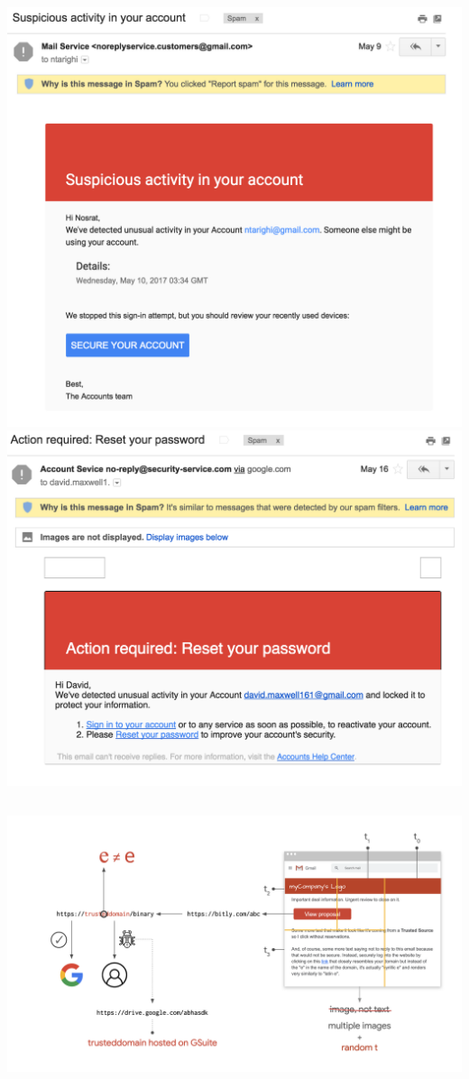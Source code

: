 \documentclass[nobackground,dvipsnames,table,aspectratio=169]{beamer}
\begin{document}
\begin{frame}{}
\begin{columns}
            \includegraphics[width=\textwidth]{susmail2}
            \includegraphics[width=\textwidth]{susmail4}
    \end{columns}
\end{frame}

\begin{frame}{}%
    \thispagestyle{empty}
    \includegraphics[width=\paperwidth]{anatomy-of-phishing-mail}
\end{frame}
\end{document}
